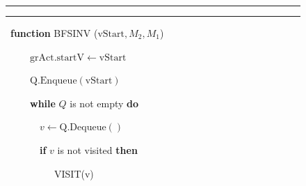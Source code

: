 \begin{figure}


\hrule





\vspace*{-5pt}





\parbox{320pt}{





}





\vspace*{4pt}





\hrule





\vspace*{3pt}





\ \textbf{function} {{\footnotesize BFS}{\normalsize I}{\footnotesize NV}} ({$\mathrm{vStart}, M_2, M_1$})





\ \ \ \ \  {$\mathrm{grAct.startV} \gets \mathrm{vStart}$}





\ \ \ \ \ {$\mathrm{Q.Enqueue}(\mathrm{vStart})$}





\ \ \ \ \ \textbf{while} {$Q$ is not empty} \textbf{do}





\ \ \ \ \ \ \ {$v \gets \mathrm{Q.Dequeue}()$}





\ \ \ \ \ \ \  \textbf{if} {$v$ is not visited} \textbf{then}





\ \ \ \ \ \ \ \ \ \ {VISIT(v)}






\end{figure}
